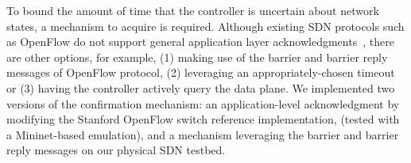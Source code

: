  To bound the amount of time that the controller is uncertain about network states, 
a mechanism to acquire  is required.  
Although existing SDN protocols such as OpenFlow
do not support general application layer acknowledgments~\cite{openflow-spec},
there are other options,
for example,
(1) making use of the barrier and barrier reply messages of OpenFlow protocol,
(2) leveraging an appropriately-chosen timeout
or (3) having the controller actively query the data plane.
We implemented two versions of the confirmation mechanism:
an application-level acknowledgment  by modifying the Stanford OpenFlow switch reference implementation, 
(tested with a Mininet-based emulation), and
a mechanism leveraging the barrier and barrier reply messages
on our physical SDN testbed.%

